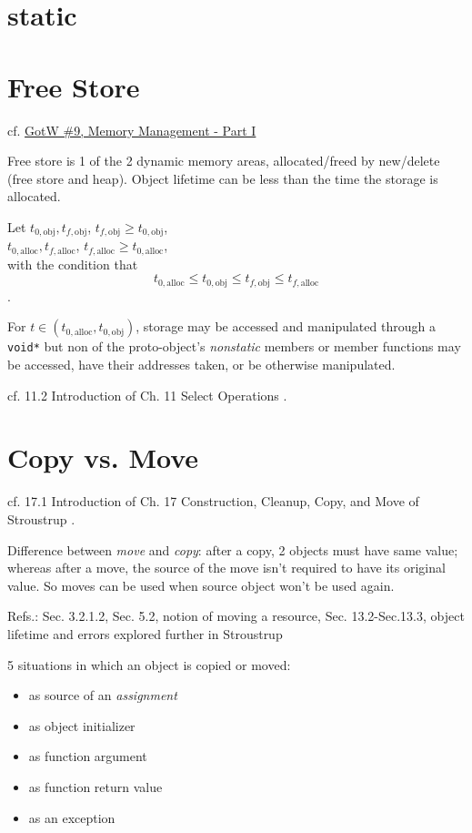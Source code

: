 \documentclass[10pt]{amsart}
\begin{document}
\begin{multicols*}{2}
\section{static}



\section{Free Store}  


cf. \href{http://www.gotw.ca/gotw/009.htm}{GotW \#9, Memory Management - Part I}

Free store is 1 of the 2 dynamic memory areas, allocated/freed by new/delete (free store and heap).  Object lifetime can be less than the time the storage is allocated.  

Let $t_{0,\text{obj}}, t_{f,\text{obj}}$, $t_{f,\text{obj}} \geq t_{0,\text{obj}}$, \\
\phantom{Let } $t_{0,\text{alloc}}, t_{f,\text{alloc}}$, $t_{f,\text{alloc}} \geq t_{0,\text{alloc}}$, \\  
with the condition that 
\[
t_{0,\text{alloc}} \leq t_{0,\text{obj}} \leq t_{f,\text{obj}} \leq t_{f,\text{alloc}}
\].  

For $t \in (t_{0,\text{alloc}} , t_{0,\text{obj}} )$, storage may be accessed and manipulated through a \verb|void*| but non of the proto-object's \emph{nonstatic} members or member functions may be accessed, have their addresses taken, or be otherwise manipulated.  




cf. 11.2 Introduction of Ch. 11 Select Operations \cite{Stro2013}.  




\section{Copy vs. Move}  
cf. 17.1 Introduction of Ch. 17 Construction, Cleanup, Copy, and Move of Stroustrup \cite{Stro2013}.  

Difference between \emph{move} and \emph{copy}: after a copy, 2 objects must have same value; whereas after a move, the source of the move isn't required to have its original value.  So moves can be used when source object won't be used again.  

Refs.: Sec. 3.2.1.2, Sec. 5.2, notion of moving a resource, Sec. 13.2-Sec.13.3, object lifetime and errors explored further in Stroustrup \cite{Stro2013}  
  
  
5 situations in which an object is copied or moved:   
\begin{itemize}
	\item as source of an \emph{assignment}
	\item as object initializer 
	\item as function argument
	\item as function return value
	\item as an exception  
\end{itemize}



\end{multicols*}
\end{document}
